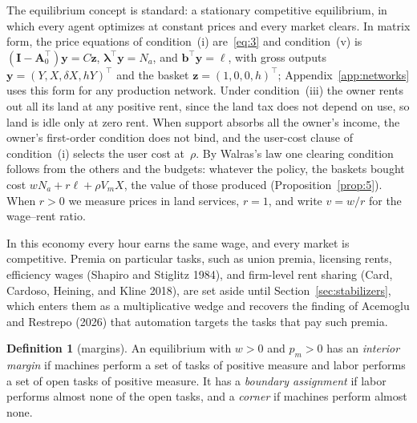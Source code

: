 \documentclass[12pt]{article}
\theoremstyle{plain}
\theoremstyle{definition}
\newtheorem{definition}{Definition}
\theoremstyle{remark}
\begin{document}
The equilibrium concept is standard: a stationary competitive equilibrium, in which every agent optimizes at constant prices and every market clears. In matrix form, the price equations of condition~(i) are~\eqref{eq:3} and condition~(v) is $(\mathbf I-\mathbf A_0^{\top})\mathbf y=C\mathbf z$, $\bm\lambda^{\top}\mathbf y=N_a$, and $\mathbf b^{\top}\mathbf y=\ell$, with gross outputs $\mathbf y=(Y,X,\delta X,hY)^{\top}$ and the basket $\mathbf z=(1,0,0,h)^{\top}$; Appendix~\ref{app:networks} uses this form for any production network. Under condition~(iii) the owner rents out all its land at any positive rent, since the land tax does not depend on use, so land is idle only at zero rent. When support absorbs all the owner's income, the owner's first-order condition does not bind, and the user-cost clause of condition~(i) selects the user cost at~$\rho$. By Walras's law one clearing condition follows from the others and the budgets: whatever the policy, the baskets bought cost $wN_a+r\ell+\rho V_mX$, the value of those produced (Proposition~\ref{prop:5}). When $r>0$ we measure prices in land services, $r=1$, and write $v=w/r$ for the wage--rent ratio.

In this economy every hour earns the same wage, and every market is competitive. Premia on particular tasks, such as union premia, licensing rents, efficiency wages (Shapiro and Stiglitz 1984), and firm-level rent sharing (Card, Cardoso, Heining, and Kline 2018), are set aside until Section~\ref{sec:stabilizers}, which enters them as a multiplicative wedge and recovers the finding of Acemoglu and Restrepo (2026) that automation targets the tasks that pay such premia.

\begin{definition}[margins]\label{def:margins}
An equilibrium with $w>0$ and $p_m>0$ has an \emph{interior margin} if machines perform a set of tasks of positive measure and labor performs a set of open tasks of positive measure. It has a \emph{boundary assignment} if labor performs almost none of the open tasks, and a \emph{corner} if machines perform almost none.
\end{definition}
\end{document}
